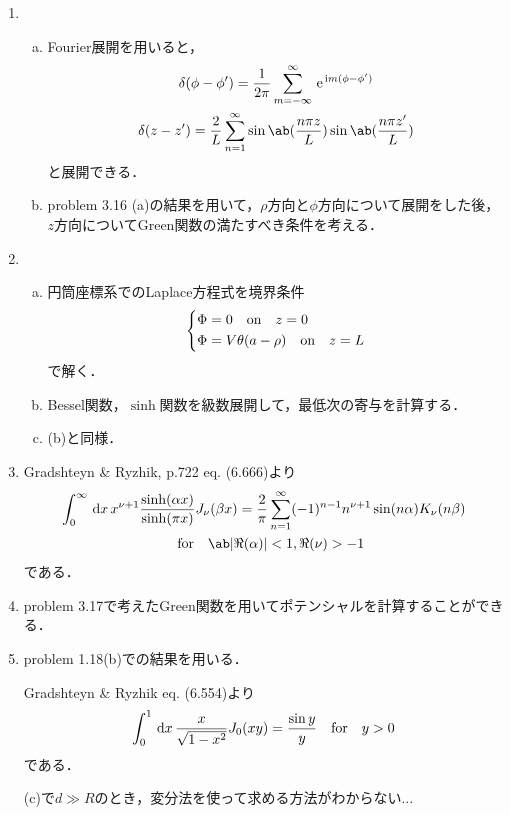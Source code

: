 \begin{enumerate}[label=\fbox{\textbf{\thesection.\arabic*}}]
  \item %
    \begin{enumerate}[(a)]  
      \item Fourier展開を用いると，
        \begin{gather}
          \delta(\phi - \phi') = \frac{1}{2\pi} \sum_{m=-\infty}^{\infty} \e^{\i m (\phi - \phi')}\\
          \delta(z- z') = \frac{2}{L} \sum_{n=1}^\infty \sin\ab(\frac{n\pi z}{L}) \sin\ab(\frac{n \pi z'}{L})
        \end{gather}
        と展開できる．
      \item problem 3.16 (a)の結果を用いて，$\rho$方向と$\phi$方向について展開をした後，$z$方向についてGreen関数の満たすべき条件を考える．
    \end{enumerate}
  \item %
    \begin{enumerate}[(a)]  
      \item  円筒座標系でのLaplace方程式を境界条件
        \begin{gather}
          \begin{dcases}
            \Phi = 0 \hspace{1em} \text{on}\hspace{1em} z = 0\\
            \Phi = V\theta(a - \rho) \hspace{1em} \text{on} \hspace{1em} z = L
          \end{dcases}
        \end{gather}
        で解く．
      \item Bessel関数，$\sinh$関数を級数展開して，最低次の寄与を計算する．
      \item (b)と同様．
    \end{enumerate}
  \item %
    Gradshteyn \& Ryzhik, p.722 eq. (6.666)より
    \begin{multline}
      \int_0^\infty \dl{x}\, x^{\nu+1} \frac{\sinh(\alpha x)}{\sinh(\pi x)} J_\nu(\beta x) = \frac{2}{\pi}\sum_{n=1}^\infty (-1)^{n-1} n^{\nu+1} \sin(n \alpha) K_\nu(n \beta)
      \\ \qq \text{for} \qq \ab|\Re(\alpha)| < 1, \Re(\nu) > -1
    \end{multline}
    である．
  \item %
    problem 3.17で考えたGreen関数を用いてポテンシャルを計算することができる．
  \item %
    problem 1.18(b)での結果を用いる．

    Gradshteyn \& Ryzhik eq. (6.554)より
    \begin{gather}  
      \int_0^1 \dl{x}\, \frac{x}{\sqrt{1-x^2}}J_0(xy) = \frac{\sin y}{y} \qq\text{for}\qq y > 0
    \end{gather}
    である．

    (c)で$d \gg R$のとき，変分法を使って求める方法がわからない...
\end{enumerate} 
